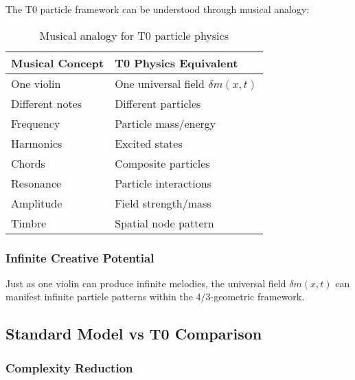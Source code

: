 \documentclass[12pt,a4paper]{article}
\newcommand{\deltafield}{\ensuremath{\delta m}}
\begin{document}
	The T0 particle framework can be understood through musical analogy:
	
	\begin{table}[htbp]
		\centering
		\begin{tabular}{ll}
			\toprule
			\textbf{Musical Concept} & \textbf{T0 Physics Equivalent} \\
			\midrule
			One violin & One universal field $\deltafield(x,t)$ \\
			Different notes & Different particles \\
			Frequency & Particle mass/energy \\
			Harmonics & Excited states \\
			Chords & Composite particles \\
			Resonance & Particle interactions \\
			Amplitude & Field strength/mass \\
			Timbre & Spatial node pattern \\
			\bottomrule
		\end{tabular}
		\caption{Musical analogy for T0 particle physics}
		\label{tab:musical_analogy}
	\end{table}
	
	\subsubsection{Infinite Creative Potential}
	\label{subsubsec:infinite_potential}
	
	Just as one violin can produce infinite melodies, the universal field $\deltafield(x,t)$ can manifest infinite particle patterns within the 4/3-geometric framework.
	
	\subsection{Standard Model vs T0 Comparison}
	\label{subsec:sm_vs_t0}
	
	\subsubsection{Complexity Reduction}
	\label{subsubsec:complexity_reduction}
	
\end{document}
